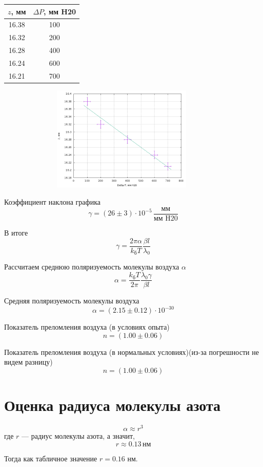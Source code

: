 \documentclass[12pt]{article}
\begin{document}
\begin{table}[h!]
	\centering
	\begin{tabular}{|c|c|}
	\hline
		$z$, мм & $\Delta P$, мм H20 \\
	\hline
		16.38 & 100 \\
	\hline
		16.32 & 200 \\
	\hline
		16.28 & 400 \\
	\hline
		16.24 & 600 \\
	\hline
		16.21 & 700 \\
	\hline
	\end{tabular}
\end{table}

\begin{figure}[h!]
	\centering
	\includegraphics[width = 10cm, height = 5cm]{plot2.png}
\end{figure}
\par
	Коэффициент наклона графика
\[
	\gamma = \left(26 \pm 3 \right) \cdot 10^{-5} \, \frac{\text{мм}}{\text{мм H20}}
\]
\par
	В итоге
\[
	\gamma = \frac{2 \pi \alpha}{k_\text{б} T} \frac{\beta l}{\lambda_0}
\]
\par
	Рассчитаем среднюю поляризуемость молекулы воздуха $\alpha$
\[
	\alpha = \frac{k_\text{б} T}{2 \pi} \frac{\lambda_0 \gamma}{\beta l}
\]
\par
	Средняя поляризуемость молекулы воздуха
\[
	\alpha = \left(2.15 \pm 0.12 \right) \cdot 10^{-30} \text{}
\]
\par
	Показатель преломления воздуха (в условиях опыта)
\[
	n = \left(1.00 \pm 0.06 \right)
\]
\par
	Показатель преломления воздуха (в нормальных условиях)(из-за погрешности не видем разницу)
\[
	n = \left(1.00 \pm 0.06 \right) 
\]

\section*{Оценка радиуса молекулы азота}
\par
\[
	\alpha \approx r^3
\]
где $r$ --- радиус молекулы азота, а значит,
\[
	r \approx 0.13 \, \text{нм}
\]
\par
	Тогда как табличное значение $r = 0.16$ нм.
\end{document}
